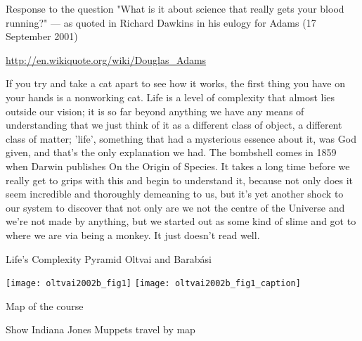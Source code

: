 Response to the question "What is it about science that really gets
your blood running?" — as quoted in Richard Dawkins in his eulogy for
Adams (17 September 2001)

\url{http://en.wikiquote.org/wiki/Douglas_Adams}

If you try and take a cat apart to see how it works, the first thing
you have on your hands is a nonworking cat. Life is a level of
complexity that almost lies outside our vision; it is so far beyond
anything we have any means of understanding that we just think of it
as a different class of object, a different class of matter; 'life',
something that had a mysterious essence about it, was God given, and
that's the only explanation we had. The bombshell comes in 1859 when
Darwin publishes On the Origin of Species. It takes a long time before
we really get to grips with this and begin to understand it, because
not only does it seem incredible and thoroughly demeaning to us, but
it's yet another shock to our system to discover that not only are we
not the centre of the Universe and we're not made by anything, but we
started out as some kind of slime and got to where we are via being a
monkey. It just doesn't read well.


Life's Complexity Pyramid\cite{oltvai2002b}
  Oltvai and Barab\'{a}si

  \texttt{[image: oltvai2002b\_fig1]}
  \texttt{[image: oltvai2002b\_fig1\_caption]}

  
Map of the course

Show Indiana Jones
Muppets travel by map














